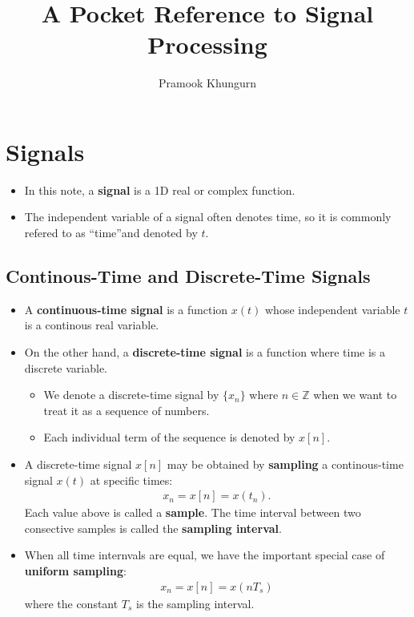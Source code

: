 \documentclass[10pt]{article}
\title{A Pocket Reference to Signal Processing}
\author{Pramook Khungurn}
\begin{document}
\maketitle

\section{Signals}

\begin{itemize}
  \item In this note, a {\bf signal} is a 1D real or complex function.

  \item The independent variable of a signal often denotes time, so it is commonly refered to as ``time''and denoted by $t$.
\end{itemize}
  
\subsection{Continous-Time and Discrete-Time Signals}

\begin{itemize}  
  \item A {\bf continuous-time signal} is a function $x(t)$ whose independent variable $t$ is a continous real variable.
  
  \item On the other hand, a {\bf discrete-time signal} is a function where time is  a discrete variable.
  \begin{itemize}
    \item We denote a discrete-time signal by $\{ x_n \}$ where $n \in \mathbb{Z}$ when we want to treat it as a sequence of numbers.
    
    \item Each individual term of the sequence is denoted by $x[n]$.
  \end{itemize}

  \item A discrete-time signal $x[n]$ may be obtained by {\bf sampling} a continous-time signal $x(t)$ at specific times:
  \begin{align*}
    x_n = x[n] = x(t_n).
  \end{align*}
  Each value above is called a {\bf sample}. The time interval between two consective samples is called the {\bf sampling interval}.

  \item When all time internvals are equal, we have the important special case of {\bf uniform sampling}:
  \begin{align*}
    x_n = x[n] = x(nT_s)
  \end{align*}
  where the constant $T_s$ is the sampling interval.
\end{itemize}
\end{document}
